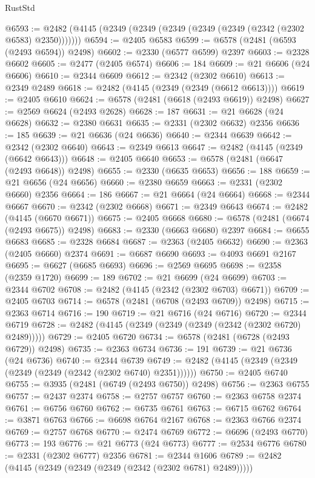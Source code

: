 \begin{lexlean}{RustStd}
\begin{coremodule}
@6593 := @2482 (@4145 (@2349 (@2349 (@2349 (@2349 (@2349 (@2342 (@2302 @6583) @2350)))))))
@6594 := @2405 @6583
@6599 := @6578 (@2481 (@6593 (@2493 @6594)) @2498)
@6602 := @2330 (@6577 @6599) @2397
@6603 := @2328 @6602
@6605 := @2477 (@2405 @6574)
@6606 := 184
@6609 := @21 @6606 (@24 @6606)
@6610 := @2344 @6609
@6612 := @2342 (@2302 @6610)
@6613 := @2349 @2489
@6618 := @2482 (@4145 (@2349 (@2349 (@6612 @6613))))
@6619 := @2405 @6610
@6624 := @6578 (@2481 (@6618 (@2493 @6619)) @2498)
@6627 := @2569 @6624 (@2493 @2628)
@6628 := 187
@6631 := @21 @6628 (@24 @6628)
@6632 := @2380 @6631
@6635 := @2331 (@2302 @6632) @2356
@6636 := 185
@6639 := @21 @6636 (@24 @6636)
@6640 := @2344 @6639
@6642 := @2342 (@2302 @6640)
@6643 := @2349 @6613
@6647 := @2482 (@4145 (@2349 (@6642 @6643)))
@6648 := @2405 @6640
@6653 := @6578 (@2481 (@6647 (@2493 @6648)) @2498)
@6655 := @2330 (@6635 @6653)
@6656 := 188
@6659 := @21 @6656 (@24 @6656)
@6660 := @2380 @6659
@6663 := @2331 (@2302 @6660) @2356
@6664 := 186
@6667 := @21 @6664 (@24 @6664)
@6668 := @2344 @6667
@6670 := @2342 (@2302 @6668)
@6671 := @2349 @6643
@6674 := @2482 (@4145 (@6670 @6671))
@6675 := @2405 @6668
@6680 := @6578 (@2481 (@6674 (@2493 @6675)) @2498)
@6683 := @2330 (@6663 @6680) @2397
@6684 := @6655 @6683
@6685 := @2328 @6684
@6687 := @2363 (@2405 @6632)
@6690 := @2363 (@2405 @6660) @2374
@6691 := @6687 @6690
@6693 := @4093 @6691 @2167
@6695 := @6627 (@6685 @6693)
@6696 := @2569 @6695
@6698 := @2358 (@2359 @1720)
@6699 := 189
@6702 := @21 @6699 (@24 @6699)
@6703 := @2344 @6702
@6708 := @2482 (@4145 (@2342 (@2302 @6703) @6671))
@6709 := @2405 @6703
@6714 := @6578 (@2481 (@6708 (@2493 @6709)) @2498)
@6715 := @2363 @6714
@6716 := 190
@6719 := @21 @6716 (@24 @6716)
@6720 := @2344 @6719
@6728 := @2482 (@4145 (@2349 (@2349 (@2349 (@2342 (@2302 @6720) @2489)))))
@6729 := @2405 @6720
@6734 := @6578 (@2481 (@6728 (@2493 @6729)) @2498)
@6735 := @2363 @6734
@6736 := 191
@6739 := @21 @6736 (@24 @6736)
@6740 := @2344 @6739
@6749 := @2482 (@4145 (@2349 (@2349 (@2349 (@2349 (@2342 (@2302 @6740) @2351))))))
@6750 := @2405 @6740
@6755 := @3935 (@2481 (@6749 (@2493 @6750)) @2498)
@6756 := @2363 @6755
@6757 := @2437 @2374
@6758 := @2757 @6757
@6760 := @2363 @6758 @2374
@6761 := @6756 @6760
@6762 := @6735 @6761
@6763 := @6715 @6762
@6764 := @3871 @6763
@6766 := @6698 @6764 @2167
@6768 := @2363 @6766 @2374
@6769 := @2757 @6768
@6770 := @2474 @6769
@6772 := @6696 (@2493 @6770)
@6773 := 193
@6776 := @21 @6773 (@24 @6773)
@6777 := @2534 @6776
@6780 := @2331 (@2302 @6777) @2356
@6781 := @2344 @1606
@6789 := @2482 (@4145 (@2349 (@2349 (@2349 (@2342 (@2302 @6781) @2489)))))

\end{coremodule}
\end{lexlean}
